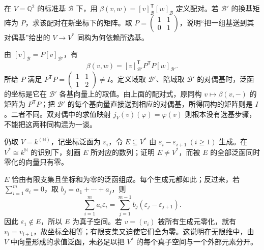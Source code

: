 \begin{exercise}\label{b2:ex:01-basis-pairing}
	在 \(V=\mathbb Q^2\) 的标准基 \(\mathcal B\) 下，用 \(\beta(v,w)=[v]_{\mathcal B}^{\mathsf T}[w]_{\mathcal B}\) 定义配对。若 \(\mathcal B'\) 的换基矩阵为 \(P\)，求该配对在新坐标下的矩阵。取 \(P=\begin{pmatrix}1&1\\0&1\end{pmatrix}\)，说明“把一组基送到其对偶基”给出的 \(V\to V^*\) 同构为何依赖所选基。
\end{exercise}
\begin{solution}
	由 \([v]_{\mathcal B}=P[v]_{\mathcal B'}\)，有
	\[
		\beta(v,w)=[v]_{\mathcal B'}^{\mathsf T}P^{\mathsf T}P[w]_{\mathcal B'}.
	\]
	所给 \(P\) 满足 \(P^{\mathsf T}P=\begin{pmatrix}1&1\\1&2\end{pmatrix}\ne I\)。定义域取 \(\mathcal B'\)、陪域取 \(\mathcal B'\) 的对偶基时，泛函的坐标是它在 \(\mathcal B'\) 各基向量上的取值。由上面的配对式，原同构 \(v\mapsto\beta(v,-)\) 的矩阵为 \(P^{\mathsf T}P\)；把 \(\mathcal B'\) 的每个基向量直接送到相应的对偶基，所得同构的矩阵则是 \(I\)。二者不同。双对偶中的求值映射 \(j_V(v)(\varphi)=\varphi(v)\) 则根本没有选基步骤，不能把这两种同构混为一谈。
\end{solution}

\begin{exercise}\label{b2:ex:01-infinite-annihilator}
	仍取 \(V=k^{(\mathbb N)}\)，记坐标泛函为 \(\varepsilon_i\)，令 \(E\subseteq V^*\) 由 \(\varepsilon_i-\varepsilon_{i+1}\ (i\ge1)\) 生成。在 \(V^*\cong k^{\mathbb N}\) 的识别下，刻画 \(E\) 所对应的数列；证明 \(E\ne V^*\)，而被 \(E\) 的全部泛函同时零化的向量只有零。
\end{exercise}
\begin{solution}
	\(E\) 恰由有限支集且坐标和为零的泛函组成。每个生成元都如此；反过来，若 \(\sum_{i=1}^ma_i=0\)，取 \(b_j=a_1+\cdots+a_j\)，则
	\[
		\sum_{i=1}^ma_i\varepsilon_i =\sum_{j=1}^{m-1}b_j(\varepsilon_j-\varepsilon_{j+1}).
	\]
	因此 \(\varepsilon_1\notin E\)，所以 \(E\) 为真子空间。若 \(v=(v_i)\) 被所有生成元零化，就有 \(v_i=v_{i+1}\)，故坐标全相等；有限支集又迫使它们全为零。这说明在无限维中，由 \(V\) 中向量形成的求值泛函，未必足以把 \(V^*\) 的每个真子空间与一个外部元素分开。
\end{solution}

